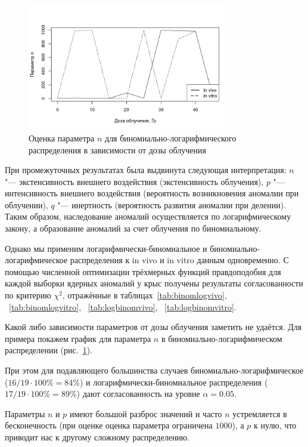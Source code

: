 \documentclass[12pt, specialist, subf, substylefile = spbu_report.rtx]{disser}
\begin{document}
	\begin{figure}[!ht]
		\centering
		\includegraphics[width = 0.8\textwidth]{logbinomn}
		\caption{Оценка параметра $n$ для биномиально-логарифмического распределения в зависимости от дозы облучения}
		\label{img:logbinomn}
	\end{figure}
	
	При промежуточных результатах была выдвинута следующая интерпретация: $ n $ "--- экстенсивность внешнего воздействия (экстенсивность облучения), $ p $ "--- интенсивность внешнего воздействия (вероятность возникновения аномалии при облучении), $ q $ "--- инертность (вероятность развития аномалии при делении). Таким образом, наследование аномалий осуществляется по логарифмическому закону, а образование аномалий за счет облучения  по биномиальному.
	
	Однако мы применим логарифмически-биномиальное и биномиально-логарифмическое распределения к in vivo и in vitro данным одновременно. С помощью численной оптимизации трёхмерных функций правдоподобия для каждой выборки ядерных аномалий у крыс получены результаты согласованности по критерию $ \chi ^2 $, отражённые в таблицах~\ref{tab:binomlogvivo}, ~\ref{tab:binomlogvitro}, ~\ref{tab:logbinomvivo}, ~\ref{tab:logbinomvitro}.
	
	Какой либо зависимости параметров от дозы облучения заметить не удаётся. Для примера покажем график для параметра $n$ в биномиально-логарифмическом распределении (рис.~\ref{img:logbinomn}).
	
	При этом для подавляющего большинства случаев биномиально-логарифмическое ($16 / 19 \cdot 100\% = 84\%$) и логарифмически-биномиальное распределения ($17 / 19 \cdot 100\% = 89\%$) дают согласованность на уровне $\alpha = 0.05$.
	
	Параметры $n$ и $p$ имеют большой разброс значений и часто $n$ устремляется в бесконечность (при оценке оценка параметра ограничена $1000$), а $p$ к нулю, что приводит нас к другому сложному распределению.
	
\end{document}
